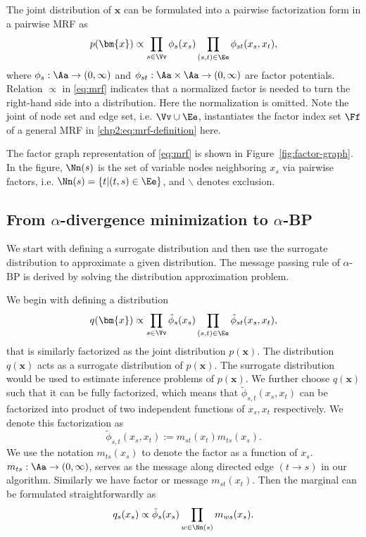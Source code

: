 The joint distribution of $\bm{x}$ can be formulated into a pairwise factorization form in a pairwise MRF as
\begin{equation}\label{eq:mrf}
  p(\bm{x}) \propto \prod_{{s\in \Vv}} \phi_s(x_s) \prod_{(s,t) \in \Ee} \phi_{st}(x_s, x_t),
\end{equation}
where $\phi_{s}: \Aa \rightarrow (0, \infty)$ and $\phi_{st}: \Aa \times \Aa \rightarrow (0, \infty)$ are factor potentials. Relation $\propto$ in \eqref{eq:mrf} indicates that a normalized factor is needed to turn the right-hand side into a distribution. Here the normalization is omitted. Note the joint of node set and edge set, i.e. $\Vv \cup \Ee$, instantiates the factor index set $\Ff$ of a general MRF in \eqref{chp2:eq:mrf-definition} here.

The factor graph representation of \eqref{eq:mrf} is shown in
Figure~\ref{fig:factor-graph}. In the figure, $\Nn(s)$ is the set of variable nodes neighboring $x_s$ via
pairwise factors, i.e. $\Nn(s) = \left\{ t|(t,s) \in \Ee \right\}$, and $\backslash$ denotes exclusion.

\subsection{From $\alpha$-divergence minimization to $\alpha$-BP}
We start with defining a surrogate distribution and then use the surrogate distribution to approximate a given distribution. The message passing rule of $\alpha$-BP is derived by solving the distribution approximation problem.

We begin with defining a distribution
\begin{equation}
  q(\bm{x}) \propto \prod_{{s\in \Vv}} \tilde{\phi}_s(x_s) \prod_{(s,t) \in \Ee} \tilde{\phi}_{st}(x_s, x_t),
\end{equation}
that is similarly factorized as the joint distribution $p(\bm{x})$. The distribution $q(\bm{x})$ acts as a surrogate distribution of $p(\bm{x})$. The surrogate distribution would be used to estimate inference problems of $p(\bm{x})$. We further choose $q(\bm{x})$ such that it can be fully factorized, which means that $\tilde{\phi}_{s,t}(x_s, x_t)$ can be factorized into product of two independent functions of $x_s, x_t$ respectively. We denote this factorization as
\begin{equation}
  \tilde{\phi}_{s,t}(x_s, x_t) := m_{st}(x_t) m_{ts}(x_s).
\end{equation}
We use the notation $m_{ts}(x_s)$ to denote the factor as a function of $x_s$. $m_{ts}: \Aa \rightarrow (0, \infty)$, serves as the message along directed edge $(t \rightarrow s)$ in our algorithm. Similarly we have factor or message $m_{st}(x_t)$. Then the marginal can be formulated straightforwardly as
\begin{equation}
  q_s(x_s) \propto \tilde{\phi}_s(x_s) \prod_{w\in \Nn(s)} m_{ws}(x_s).
\end{equation}

